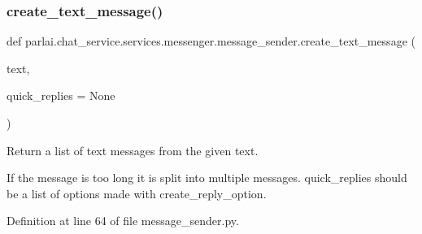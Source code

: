 \subsubsection{\texorpdfstring{create\+\_\+text\+\_\+message()}{create\_text\_message()}}
{\footnotesize\ttfamily def parlai.\+chat\+\_\+service.\+services.\+messenger.\+message\+\_\+sender.\+create\+\_\+text\+\_\+message (\begin{DoxyParamCaption}\item[{}]{text,  }\item[{}]{quick\+\_\+replies = {\ttfamily None} }\end{DoxyParamCaption})}

\begin{DoxyVerb}Return a list of text messages from the given text.

If the message is too long it is split into multiple messages. quick_replies should
be a list of options made with create_reply_option.
\end{DoxyVerb}
 

Definition at line 64 of file message\+\_\+sender.\+py.



